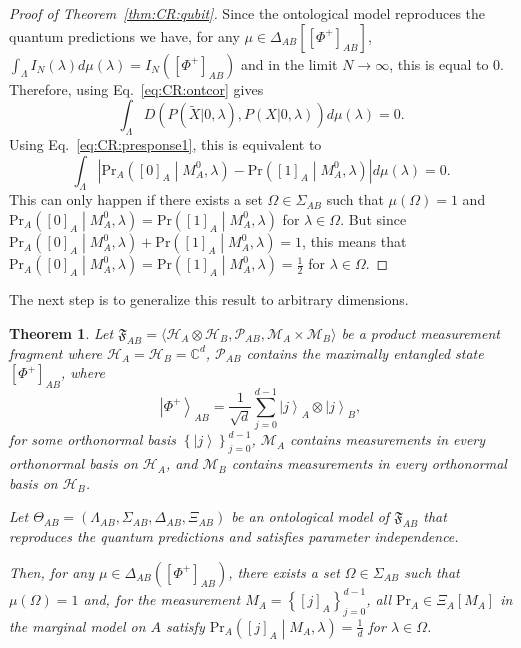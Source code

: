 \documentclass[DIV=calc,fontsize=12pt]{scrartcl} %
\theoremstyle{definition}
\theoremstyle{plain}
\newtheorem{theorem}[definition]{Theorem}
\newcommand{\Ket}[1]{\ensuremath{\left \vert #1 \right \rangle}}
\newcommand{\Proj}[1]{\ensuremath{\left [ #1 \right ]}}
\newcommand{\Hilb}[1][]{\ensuremath{\mathcal{H}_{#1}}}
\begin{document}
\begin{proof}[Proof of Theorem~\ref{thm:CR:qubit}]
Since the ontological model reproduces the quantum predictions we
have, for any $\mu \in \Delta_{AB} \left [ \Proj{\Phi^+}_{AB} \right
]$, $\int_{\Lambda} I_N(\lambda) d\mu(\lambda) = I_N \left (
\Proj{\Phi^+}_{AB} \right )$ and in the limit $N \rightarrow
\infty$, this is equal to $0$.  Therefore, using
Eq.~\eqref{eq:CR:ontcor} gives
\begin{equation}
\int_{\Lambda}
D(P(\tilde{X}|0,\lambda),P(X|0,\lambda))d\mu(\lambda) = 0.
\end{equation}
Using Eq.~\eqref{eq:CR:presponse1}, this is equivalent to
\begin{equation}
\int_{\Lambda}\left | \text{Pr}_A \left ( \Proj{0}_A \middle |
M^0_A, \lambda \right ) -
\text{Pr} \left ( \Proj{1}_A \middle | M^0_A, \lambda \right )
\right |d\mu(\lambda) = 0.
\end{equation}
This can only happen if there exists a set $\Omega \in \Sigma_{AB}$
such that $\mu(\Omega) = 1$ and $\text{Pr}_A \left ( \Proj{0}_A
\middle | M^0_A, \lambda \right ) = \text{Pr} \left ( \Proj{1}_A
\middle | M^0_A, \lambda \right )$ for $\lambda \in \Omega$.  But
since $\text{Pr}_A \left ( \Proj{0}_A \middle | M^0_A, \lambda
\right ) + \text{Pr} \left ( \Proj{1}_A \middle | M^0_A, \lambda
\right ) = 1$, this means that $\text{Pr}_A \left ( \Proj{0}_A
\middle | M^0_A, \lambda \right ) = \text{Pr} \left ( \Proj{1}_A
\middle | M^0_A, \lambda \right ) = \frac{1}{2}$ for $\lambda \in
\Omega$.
\end{proof}

The next step is to generalize this result to arbitrary dimensions.

\begin{theorem}
\label{thm:CR:qudit}
Let $\mathfrak{F}_{AB} = \langle \Hilb[A] \otimes \Hilb[B],
\mathcal{P}_{AB}, \mathcal{M}_A \times \mathcal{M}_B \rangle$ be a
product measurement fragment where $\Hilb[A] = \Hilb[B] =
\mathbb{C}^d$, $\mathcal{P}_{AB}$ contains the maximally entangled
state $\Proj{\Phi^+}_{AB}$, where
\begin{equation}
\Ket{\Phi^+}_{AB} = \frac{1}{\sqrt{d}} \sum_{j=0}^{d-1} \Ket{j}_A
\otimes \Ket{j}_B,
\end{equation}
for some orthonormal basis $\left \{ \Ket{j} \right \}_{j=0}^{d-1}$,
$\mathcal{M}_A$ contains measurements in every orthonormal basis on
$\Hilb[A]$, and $\mathcal{M}_B$ contains measurements in every
orthonormal basis on $\Hilb[B]$.

Let $\Theta_{AB} = (\Lambda_{AB}, \Sigma_{AB}, \Delta_{AB}, \Xi_{AB})$
be an ontological model of $\mathfrak{F}_{AB}$ that reproduces the
quantum predictions and satisfies parameter independence.

Then, for any $\mu \in \Delta_{AB} \left (\Proj{\Phi^+}_{AB} \right
)$, there exists a set $\Omega \in \Sigma_{AB}$ such that
$\mu(\Omega) = 1$ and, for the measurement $M_A = \left \{\Proj{j}_A
\right \}_{j=0}^{d-1}$, all $\mathrm{Pr}_A \in \Xi_A[M_A]$ in the
marginal model on $A$ satisfy $\mathrm{Pr}_A \left (\Proj{j}_A \middle
| M_A, \lambda \right ) = \frac{1}{d}$ for $\lambda \in \Omega$.
\end{theorem}
\end{document}
